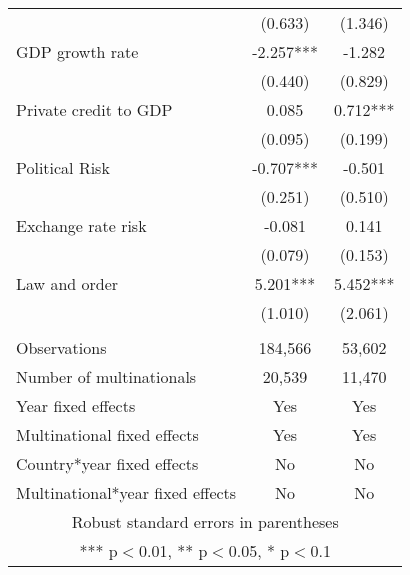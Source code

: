 \begin{tabular}{lcc}
 & (0.633) & (1.346) \\
GDP growth rate & -2.257*** & -1.282 \\
 & (0.440) & (0.829) \\
Private credit to GDP & 0.085 & 0.712*** \\
 & (0.095) & (0.199) \\
Political Risk & -0.707*** & -0.501 \\
 & (0.251) & (0.510) \\
Exchange rate risk & -0.081 & 0.141 \\
 & (0.079) & (0.153) \\
Law and order & 5.201*** & 5.452*** \\
 & (1.010) & (2.061) \\
 &  &  \\
Observations & 184,566 & 53,602 \\
Number of multinationals & 20,539 & 11,470 \\
Year fixed effects & Yes & Yes \\
Multinational fixed effects & Yes & Yes \\
Country*year fixed effects & No & No \\
 Multinational*year fixed effects & No & No \\ \hline
\multicolumn{3}{c}{ Robust standard errors in parentheses} \\
\multicolumn{3}{c}{ *** p$<$0.01, ** p$<$0.05, * p$<$0.1} \\
\end{tabular}

